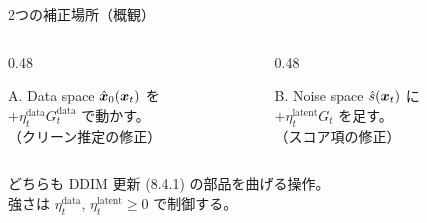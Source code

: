 \begin{frame}{2つの補正場所（概観）}
    \begin{columns}[T,onlytextwidth]
        \begin{column}{0.48\textwidth}
            \begin{block}{A. Data space}
                $\hat{\bm{x}}_0(\bm{x}_t)$ を\\
                $+\eta_t^{\mathrm{data}}G_t^{\mathrm{data}}$ で動かす。\\
                （クリーン推定の修正）
            \end{block}
        \end{column}
        \begin{column}{0.48\textwidth}
            \begin{block}{B. Noise space}
                $\hat{s}(\bm{x}_t)$ に\\
                $+\eta_t^{\mathrm{latent}}G_t$ を足す。\\
                （スコア項の修正）
            \end{block}
        \end{column}
    \end{columns}
    \vfill
    どちらも DDIM 更新 (8.4.1) の部品を曲げる操作。\\
    強さは $\eta_t^{\mathrm{data}},\,\eta_t^{\mathrm{latent}}\ge 0$ で制御する。
\end{frame}
